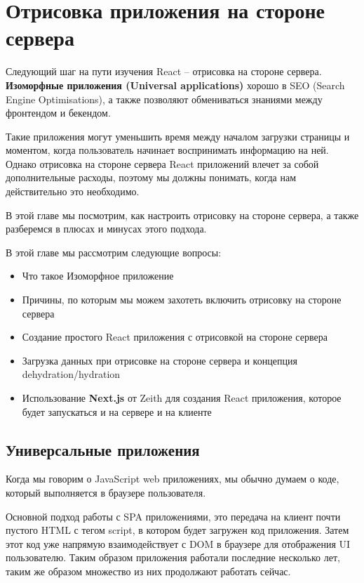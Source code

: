 \chapter{Отрисовка приложения на стороне сервера}

Следующий шаг на пути изучения React -- отрисовка на стороне сервера. \textbf{Изоморфные приложения (Universal applications)} хорошо в SEO (Search Engine Optimisations), а также позволяют обмениваться знаниями между фронтендом и бекендом. 

Такие приложения могут уменьшить время между началом загрузки страницы и моментом, когда пользователь начинает воспринимать информацию на ней. Однако отрисовка на стороне сервера React приложений влечет за собой дополнительные расходы, поэтому мы должны понимать, когда нам действительно это необходимо.

В этой главе мы посмотрим, как настроить отрисовку на стороне сервера, а также разберемся в плюсах и минусах этого подхода.

В этой главе мы рассмотрим следующие вопросы:

\begin{itemize}
	\item Что такое Изоморфное приложение 
	\item Причины, по которым мы можем захотеть включить отрисовку на стороне сервера
	\item Создание простого React приложения с отрисовкой на стороне сервера
	\item Загрузка данных при отрисовке на стороне сервера и концепция dehydration/hydration
	\item Использование \textbf{Next.js} от Zeith для создания React приложения, которое будет запускаться и на сервере и на клиенте
\end{itemize}

\section{Универсальные приложения}

Когда мы говорим о JavaScript web приложениях, мы обычно думаем о коде, который выполняется в браузере пользователя.

Основной подход работы с SPA приложениями, это передача на клиент почти пустого HTML с тегом script, в котором будет загружен код приложения. Затем этот код уже напрямую взаимодействует с DOM в браузере для отображения UI пользователю. Таким образом приложения работали последние несколько лет, таким же образом множество из них продолжают работать сейчас. 

